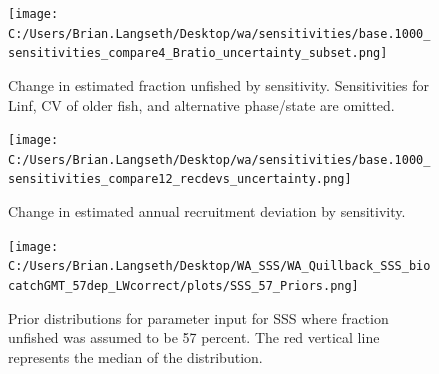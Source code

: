 \documentclass[11pt,
  english,
  letterpaper,
]{article}
\begin{document}
\tagmcend\tagstructend


\begin{figure}
\centering
\texttt{[image: C:/Users/Brian.Langseth/Desktop/wa/sensitivities/base.1000\_sensitivities\_compare4\_Bratio\_uncertainty\_subset.png]}
\caption{Change in estimated fraction unfished by sensitivity. Sensitivities for Linf, CV of older fish, and alternative phase/state are omitted.\label{fig:sens-depl-subset}}
\end{figure}

\tagmcend\tagstructend


\begin{figure}
\centering
\texttt{[image: C:/Users/Brian.Langseth/Desktop/wa/sensitivities/base.1000\_sensitivities\_compare12\_recdevs\_uncertainty.png]}
\caption{Change in estimated annual recruitment deviation by sensitivity.\label{fig:sens-recdev}}
\end{figure}

\tagmcend\tagstructend


\begin{figure}
\centering
\texttt{[image: C:/Users/Brian.Langseth/Desktop/WA\_SSS/WA\_Quillback\_SSS\_biocatchGMT\_57dep\_LWcorrect/plots/SSS\_57\_Priors.png]}
\caption{Prior distributions for parameter input for SSS where fraction unfished was assumed to be 57 percent. The red vertical line represents the median of the distribution.\label{fig:sss-prior-57}}
\end{figure}

\tagmcend\tagstructend

\newpage

\end{document}
